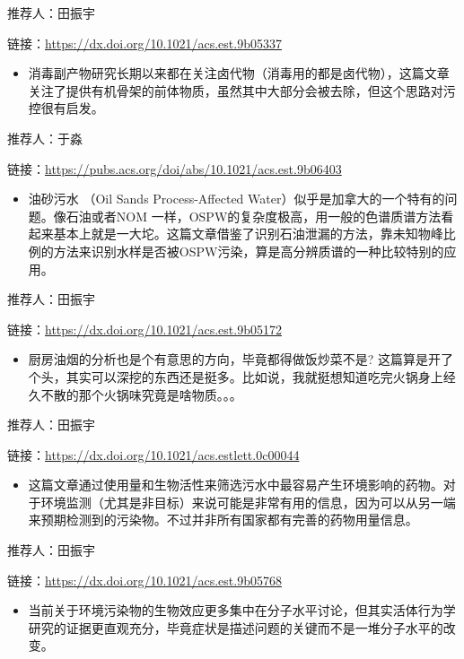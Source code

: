 \documentclass[
]{book}
\providecommand{\tightlist}{%
  \setlength{\itemsep}{0pt}\setlength{\parskip}{0pt}}
\begin{document}
推荐人：田振宇

链接：\url{https://dx.doi.org/10.1021/acs.est.9b05337}

\begin{itemize}
\tightlist
\item
  消毒副产物研究长期以来都在关注卤代物（消毒用的都是卤代物），这篇文章关注了提供有机骨架的前体物质，虽然其中大部分会被去除，但这个思路对污控很有启发。
\end{itemize}

推荐人：于淼

链接：\url{https://pubs.acs.org/doi/abs/10.1021/acs.est.9b06403}

\begin{itemize}
\tightlist
\item
  油砂污水 （Oil Sands Process-Affected Water）似乎是加拿大的一个特有的问题。像石油或者NOM 一样，OSPW的复杂度极高，用一般的色谱质谱方法看起来基本上就是一大坨。这篇文章借鉴了识别石油泄漏的方法，靠未知物峰比例的方法来识别水样是否被OSPW污染，算是高分辨质谱的一种比较特别的应用。
\end{itemize}

推荐人：田振宇

链接：\url{https://dx.doi.org/10.1021/acs.est.9b05172}

\begin{itemize}
\tightlist
\item
  厨房油烟的分析也是个有意思的方向，毕竟都得做饭炒菜不是? 这篇算是开了个头，其实可以深挖的东西还是挺多。比如说，我就挺想知道吃完火锅身上经久不散的那个火锅味究竟是啥物质。。。
\end{itemize}

推荐人：田振宇

链接：\url{https://dx.doi.org/10.1021/acs.estlett.0c00044}

\begin{itemize}
\tightlist
\item
  这篇文章通过使用量和生物活性来筛选污水中最容易产生环境影响的药物。对于环境监测（尤其是非目标）来说可能是非常有用的信息，因为可以从另一端来预期检测到的污染物。不过并非所有国家都有完善的药物用量信息。
\end{itemize}

推荐人：田振宇

链接：\url{https://dx.doi.org/10.1021/acs.est.9b05768}

\begin{itemize}
\tightlist
\item
  当前关于环境污染物的生物效应更多集中在分子水平讨论，但其实活体行为学研究的证据更直观充分，毕竟症状是描述问题的关键而不是一堆分子水平的改变。
\end{itemize}
\end{document}

